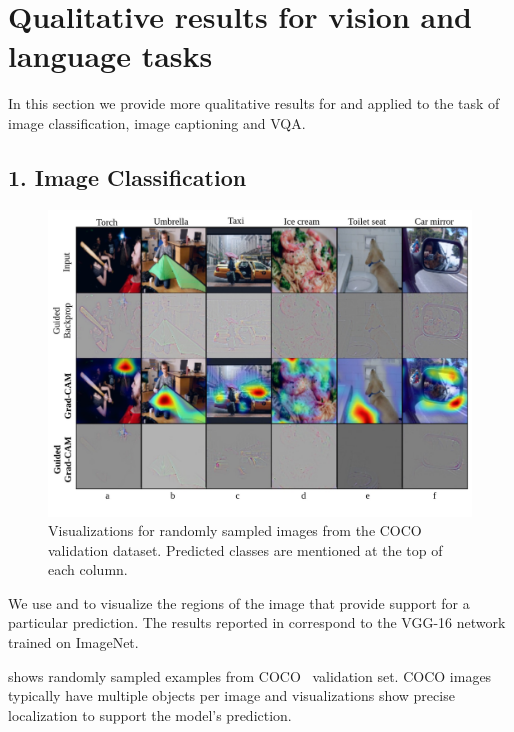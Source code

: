 \vspace{-5pt}
\section{Qualitative results for vision and language tasks}\label{sec:sup_experiments}

In this section we provide more qualitative results for \gcam{} and \cgb{} applied to the task of image classification, image captioning and VQA.
\vspace{-5pt}
\subsection*{1. Image Classification}

\begin{figure}
 \centering
 \includegraphics[width=1\linewidth]{figures/classification_supp.jpg}
 \caption{Visualizations for randomly sampled images from the COCO validation dataset.
 Predicted classes are mentioned at the top of each column.}
 \label{fig:classification}
\end{figure}


We use \gcam{} and \cgb{} to visualize the regions of the image that provide support for a particular prediction.
The results reported in  correspond to the VGG-16 \cite{simonyan_arxiv14} network trained on ImageNet.


 shows randomly sampled examples from COCO~\cite{Lin_2014} validation set.
COCO images typically have multiple objects per image and \gcam{} visualizations show precise localization to support the model's prediction.

